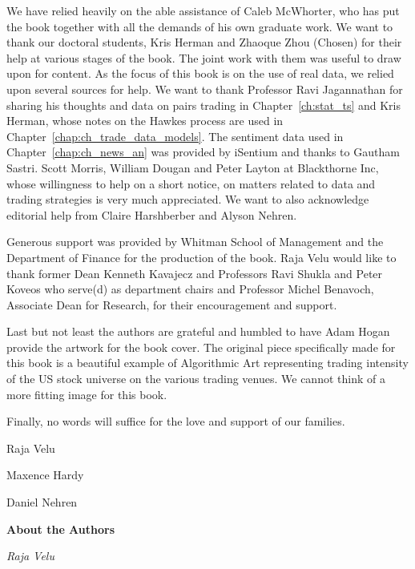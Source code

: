 We have relied heavily on the able assistance of Caleb McWhorter, who has put the book together with all the demands of his own graduate work. We want to thank our doctoral students, Kris Herman and Zhaoque Zhou (Chosen) for their help at various stages of the book. The joint work with them was useful to draw upon for content. As the focus of this book is on the use of real data, we relied upon several sources for help. We want to thank Professor Ravi Jagannathan for sharing his thoughts and data on pairs trading in Chapter~\ref{ch:stat_ts} and Kris Herman, whose notes on the Hawkes process are used in Chapter~\ref{chap:ch_trade_data_models}. The sentiment data used in Chapter~\ref{chap:ch_news_an} was provided by iSentium and thanks to Gautham Sastri. Scott Morris, William Dougan and Peter Layton at Blackthorne Inc, whose willingness to help on a short notice, on matters related to data and trading strategies is very much appreciated. We want to also acknowledge editorial help from Claire Harshberber and Alyson Nehren. 


Generous support was provided by Whitman School of Management and the Department of Finance for the production of the book. Raja Velu would like to thank former Dean Kenneth Kavajecz and Professors Ravi Shukla and Peter Koveos who serve(d) as department chairs and Professor Michel Benavoch, Associate Dean for Research, for their encouragement and support.


Last but not least the authors are grateful and humbled to have Adam Hogan provide the artwork for the book cover. The original piece specifically made for this book is a beautiful example of  Algorithmic Art representing trading intensity of the US stock universe on the various trading venues. We cannot think of a more fitting image for this book.  


Finally, no words will suffice for the love and support of our families. \vspace{3\baselineskip}


\noindent Raja Velu \par
\noindent Maxence Hardy \par
\noindent Daniel Nehren


\newpage


{\noindent\Large\bfseries About the Authors} \twomedskip

{\noindent\large\itshape Raja Velu} \medbreak

